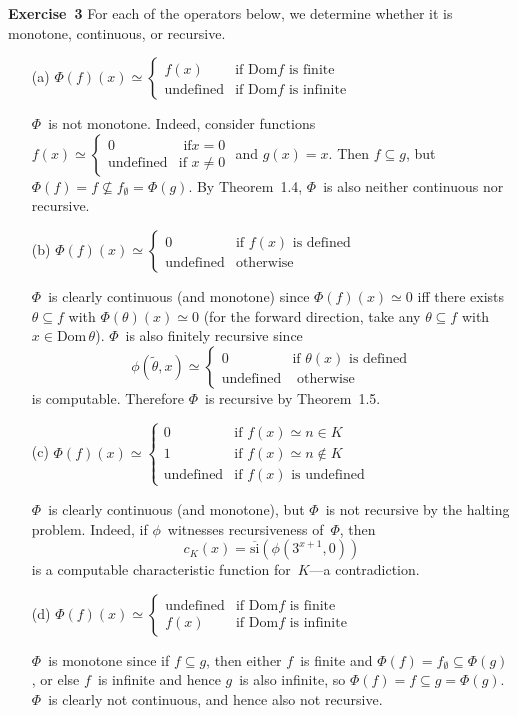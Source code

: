 \documentclass[letterpaper]{article}
\newcommand{\exercise}[2][]{\noindent\textbf{Exercise~{#2}}\ifthenelse{\isempty{#1}}{\textbf{.}}{ ({#1})\textbf{.}}}
\newcommand{\dom}{\mathrm{Dom}}
\newcommand{\si}{\mathrm{si}}
\newcommand{\sic}{\overline{\si}}
\newcommand{\code}[1]{\widetilde{{#1}}}
\theoremstyle{plain}
\theoremstyle{definition}
\theoremstyle{remark}
\begin{document}
\bigskip
\exercise{3}
For each of the operators below, we determine whether it is monotone, continuous, or recursive.
\begin{enumerate}[itemsep=0pt]
\item[(a)] $\Phi(f)(x)\simeq\begin{cases}f(x)&\text{if }\dom f\text{ is finite}\\\text{undefined}&\text{if }\dom f\text{ is infinite}\end{cases}$

$\Phi$~is not monotone. Indeed, consider functions $f(x)\simeq\begin{cases}0&\text{ if}x=0\\\text{undefined}&\text{if }x\ne0\end{cases}$ and $g(x)=x$. Then $f\subseteq g$, but $\Phi(f)=f\not\subseteq f_{\emptyset}=\Phi(g)$. By Theorem~1.4, $\Phi$~is also neither continuous nor recursive.

\item[(b)] $\Phi(f)(x)\simeq\begin{cases}0&\text{if }f(x)\text{ is defined}\\\text{undefined}&\text{otherwise}\end{cases}$

$\Phi$~is clearly continuous (and monotone) since $\Phi(f)(x)\simeq 0$ iff there exists $\theta\subseteq f$ with $\Phi(\theta)(x)\simeq 0$ (for the forward direction, take any $\theta\subseteq f$ with $x\in\dom\,\theta$). $\Phi$~is also finitely recursive since
$$\phi(\code{\theta},x)\simeq\begin{cases}
0&\text{if }\theta(x)\text{ is defined}\\
\text{undefined}&\text{ otherwise}
\end{cases}$$
is computable. Therefore $\Phi$~is recursive by Theorem~1.5.

\item[(c)] $\Phi(f)(x)\simeq\begin{cases}0&\text{if }f(x)\simeq n\in K\\1&\text{if }f(x)\simeq n\not\in K\\\text{undefined}&\text{if }f(x)\text{ is undefined}\end{cases}$

$\Phi$~is clearly continuous (and monotone), but $\Phi$~is not recursive by the halting problem. Indeed, if $\phi$~witnesses recursiveness of~$\Phi$, then
$$c_K(x)=\sic(\phi(3^{x+1},0))$$
is a computable characteristic function for~$K$---a contradiction.

\item[(d)] $\Phi(f)(x)\simeq\begin{cases}\text{undefined}&\text{if }\dom f\text{ is finite}\\f(x)&\text{if }\dom f\text{ is infinite}\end{cases}$

$\Phi$~is monotone since if $f\subseteq g$, then either $f$~is finite and $\Phi(f)=f_{\emptyset}\subseteq\Phi(g)$, or else $f$~is infinite and hence $g$~is also infinite, so $\Phi(f)=f\subseteq g=\Phi(g)$. $\Phi$~is clearly not continuous, and hence also not recursive.
\end{enumerate}
\end{document}
